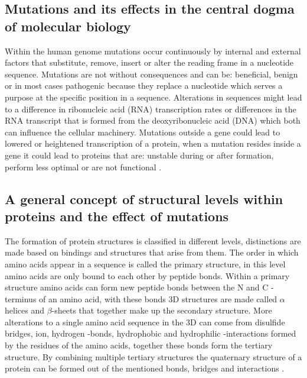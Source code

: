 \subsection{Mutations and its effects in the central dogma of molecular biology}
Within the human genome mutations occur continuously by internal and external factors that substitute, remove, insert or alter the reading frame in a nucleotide sequence. Mutations are not without consequences and can be: beneficial, benign or in most cases pathogenic because they replace a nucleotide which serves a purpose at the specific position in a sequence. Alterations in sequences might lead to a difference in ribonucleic acid (RNA) transcription rates or differences in the RNA transcript that is formed from the deoxyribonucleic acid (DNA) which both can influence the cellular machinery. Mutations outside a gene could lead to lowered or heightened transcription of a protein, when a mutation resides inside a gene it could lead to proteins that are: unstable during or after formation, perform less optimal or are not functional \cite{nih_sickle_nodate,nih_cystic_nodate,nih_traps_2016}.

\subsection{A general concept of structural levels within proteins and the effect of mutations}
The formation of protein structures is classified in different levels, distinctions are made based on bindings and structures that arise from them. 
The order in which amino acids appear in a sequence is called the primary structure, in this level amino acids are only bound to each other by peptide bonds. 
Within a primary structure amino acids can form new peptide bonds between the N and C -terminus of an amino acid, with these bonds 3D structures are made called $\alpha$ helices and $\beta$-sheets that together make up the secondary structure.
More alterations to a single amino acid sequence in the 3D can come from disulfide bridges, ion, hydrogen -bonds, hydrophobic and hydrophilic -interactions formed by the residues of the amino acids, together these bonds form the tertiary structure.
By combining multiple tertiary structures the quaternary structure of a protein can be formed out of the mentioned bonds, bridges and interactions \cite{wikipedia_protein_2019, bennion_protein_2002}.

